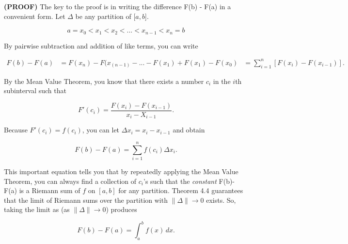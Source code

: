 \documentclass[12pt]{article}
\begin{document}
\bigskip
\color{myblue}
\noindent \textbf{(PROOF)} \color{black} \hspace{.2cm} The key to the proof is in writing the difference F(b) - F(a) in a convenient form. Let $\Delta$ be any partition of [$a, b$].

$$ a = x_0 < x_1 < x_2 < ... < x_{n-1} < x_n = b $$

\noindent By pairwise subtraction and addition of like terms, you can write

\begin{align*}
F(b) - F(a) &= F(x_n) - F(x_(n-1) - ... - F(x_1) + F(x_1) - F(x_0)
&= \sum_{i=1}^{n} [F(x_i) - F(x_{i-1})].
\end{align*}

\noindent By the Mean Value Theorem, you know that there exists a number $c_i$ in the $i$th subinterval such that

$$F'(c_i) = \frac{F(x_i) - F(x_{i-1})}{x_i - X_{i-1}}.$$

\noindent Because $F'(c_i) = f(c_i)$, you can let $\Delta x_i = x_i - x_{i-1}$ and obtain

$$ F(b)-F(a) = \sum_{i=1}^{n} f(c_i)\Delta x_i. $$

\noindent This important equation tells you that by repeatedly applying the Mean Value Theorem, you can always find a collection of $c_i$'s such that the \textit{constant} F(b)- F(a) is a Riemann sum of $f$ on $[a,b]$ for any partition. Theorem 4.4 guarantees that the limit of Riemann sums over the partition with $\| \Delta \| \to 0$ exists. So, taking the limit as (as $\| \Delta \| \to 0$) produces

$$ F(b) - F(a) = \int_{a}^{b} f(x) \,dx. $$

\bigskip
\end{document}
